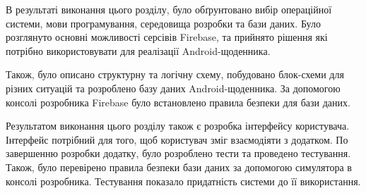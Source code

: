\documentclass[../main.tex]{subfiles}
\begin{document}
В результаті виконання цього розділу, було обґрунтовано вибір операційної системи, мови програмування, середовища розробки та бази даних. Було розглянуто основні можливості серсівів Firebase, та прийнято рішення які потрібно використовувати для реалізації Android-щоденника.

Також, було описано структурну та логічну схему, побудовано блок-схеми для різних ситуацій та розроблено базу даних Android-щоденника. За допомогою консолі розробника Firebase було встановлено правила безпеки для бази даних. 

Результатом виконання цього розділу також є розробка інтерфейсу користувача. Інтерфейс потрібний для того, щоб користувач зміг взаємодіяти з додатком. По завершенню розробки додатку, було розроблено тести та проведено тестування. Також, було перевірено правила безпеки бази даних за допомогою симулятора в консолі розробника. Тестування показало придатність системи до її використання.
	
\end{document}
